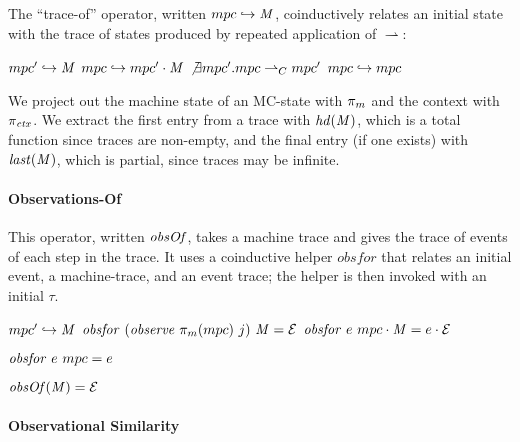 \documentclass[10pt,conference]{ieeetran}%
\theoremstyle{definition}
\begin{document}
The ``trace-of'' operator, written \(mpc \hookrightarrow \mathit{M} \),
coinductively relates an initial state with the trace of states
produced by repeated application of \(\rightharpoonup\):

            {\(mpc' \hookrightarrow \mathit{M} \)}
            {\(mpc \hookrightarrow mpc' \cdot \mathit{M} \)}%
\judgment%
         {\(\not\exists mpc'. mpc \overset{}{\rightharpoonup}_C mpc'\)}
         {\(mpc \hookrightarrow mpc\)}

We project out the machine state of an MC-state with \(\pi_m\)
and the context with \(\pi_{\mathit{ctx}}\).
We extract the first entry from a trace with \(\mathit{hd}(\mathit{M})\), which is a total
function since traces are non-empty, and the final entry (if one exists) with
\(\mathit{last}(\mathit{M})\), which is partial, since traces may be infinite.

\paragraph*{Observations-Of}

This operator, written \(\mathit{obsOf}\), takes a machine trace and
gives the trace of events of each step in
the trace. It uses a coinductive helper \(\mathit{obsfor}\) that relates an
initial event, a machine-trace, and an event trace; the helper is
then invoked with an initial \(\tau\).

                  {\(mpc' \hookrightarrow \mathit{M}\)}
                  {\(\mathit{obsfor} ~ (\mathit{observe} ~ \pi_m(mpc) ~ j) ~ \mathit{M} = \mathcal{E}\)}
                  {\(\mathit{obsfor} ~ e ~ mpc \cdot \mathit{M} = e \cdot \mathcal{E}\)}

\begin{minipage}[b]{.4\columnwidth}
  \judgment{}
           {\(\mathit{obsfor} ~ e ~ mpc = e\)}
\end{minipage}
\begin{minipage}[b]{.4\columnwidth}
         {\(\mathit{obsOf}(\mathit{M}) = \mathcal{E}\)}
\end{minipage}

\paragraph*{Observational Similarity}
\end{document}
